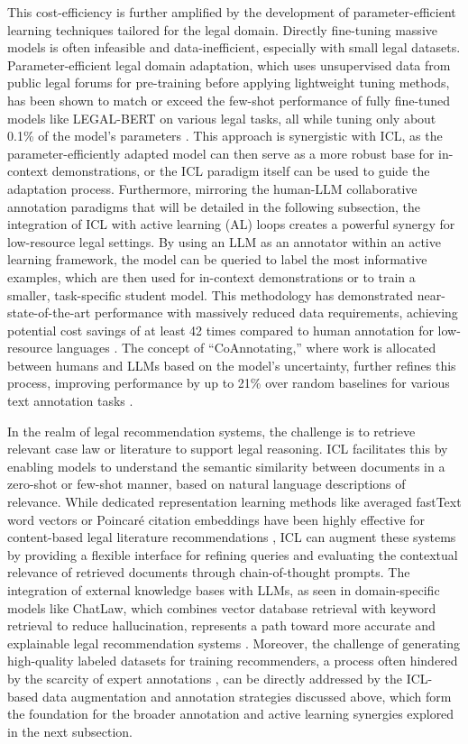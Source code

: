 \documentclass[11pt]{article}
\begin{document}
This cost-efficiency is further amplified by the development of parameter-efficient learning techniques tailored for the legal domain. Directly fine-tuning massive models is often infeasible and data-inefficient, especially with small legal datasets. Parameter-efficient legal domain adaptation, which uses unsupervised data from public legal forums for pre-training before applying lightweight tuning methods, has been shown to match or exceed the few-shot performance of fully fine-tuned models like LEGAL-BERT on various legal tasks, all while tuning only about 0.1\% of the model's parameters \cite{ref575}. This approach is synergistic with ICL, as the parameter-efficiently adapted model can then serve as a more robust base for in-context demonstrations, or the ICL paradigm itself can be used to guide the adaptation process. Furthermore, mirroring the human-LLM collaborative annotation paradigms that will be detailed in the following subsection, the integration of ICL with active learning (AL) loops creates a powerful synergy for low-resource legal settings. By using an LLM as an annotator within an active learning framework, the model can be queried to label the most informative examples, which are then used for in-context demonstrations or to train a smaller, task-specific student model. This methodology has demonstrated near-state-of-the-art performance with massively reduced data requirements, achieving potential cost savings of at least 42 times compared to human annotation for low-resource languages \cite{ref576}. The concept of ``CoAnnotating,'' where work is allocated between humans and LLMs based on the model's uncertainty, further refines this process, improving performance by up to 21\% over random baselines for various text annotation tasks \cite{ref577}.

In the realm of legal recommendation systems, the challenge is to retrieve relevant case law or literature to support legal reasoning. ICL facilitates this by enabling models to understand the semantic similarity between documents in a zero-shot or few-shot manner, based on natural language descriptions of relevance. While dedicated representation learning methods like averaged fastText word vectors or Poincaré citation embeddings have been highly effective for content-based legal literature recommendations \cite{ref578}, ICL can augment these systems by providing a flexible interface for refining queries and evaluating the contextual relevance of retrieved documents through chain-of-thought prompts. The integration of external knowledge bases with LLMs, as seen in domain-specific models like ChatLaw, which combines vector database retrieval with keyword retrieval to reduce hallucination, represents a path toward more accurate and explainable legal recommendation systems \cite{ref579}. Moreover, the challenge of generating high-quality labeled datasets for training recommenders, a process often hindered by the scarcity of expert annotations \cite{ref580}, can be directly addressed by the ICL-based data augmentation and annotation strategies discussed above, which form the foundation for the broader annotation and active learning synergies explored in the next subsection.
\end{document}
